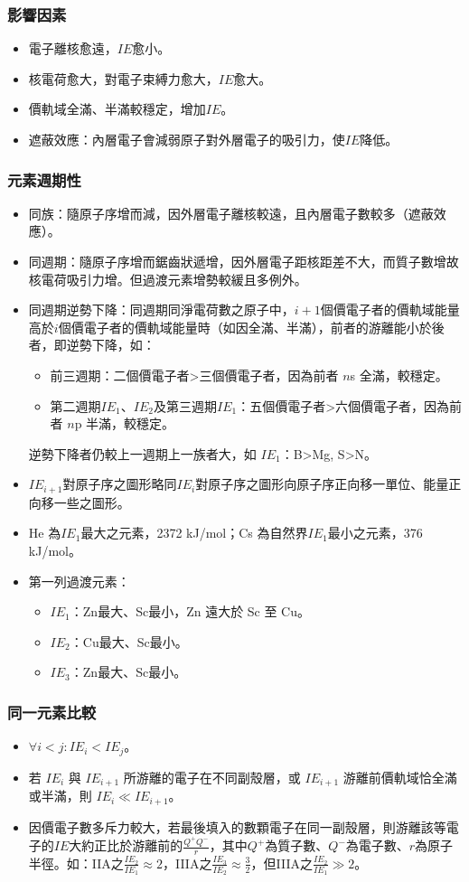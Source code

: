 \documentclass[a4paper,12pt]{article}
\begin{document}
\subsubsection{影響因素}
\begin{itemize}
\item 電子離核愈遠，$IE$愈小。
\item 核電荷愈大，對電子束縛力愈大，$IE$愈大。
\item 價軌域全滿、半滿較穩定，增加$IE$。 
\item 遮蔽效應：內層電子會減弱原子對外層電子的吸引力，使$IE$降低。
\end{itemize}
\subsubsection{元素週期性}
\begin{itemize}
\item 同族：隨原子序增而減，因外層電子離核較遠，且內層電子數較多（遮蔽效應）。
\item 同週期：隨原子序增而鋸齒狀遞增，因外層電子距核距差不大，而質子數增故核電荷吸引力增。但過渡元素增勢較緩且多例外。
\item 同週期逆勢下降：同週期同淨電荷數之原子中，$i+1$個價電子者的價軌域能量高於$i$個價電子者的價軌域能量時（如因全滿、半滿），前者的游離能小於後者，即逆勢下降，如：
\begin{itemize}
\item 前三週期：二個價電子者>三個價電子者，因為前者 $n$s 全滿，較穩定。
\item 第二週期$IE_1$、$IE_2$及第三週期$IE_1$：五個價電子者>六個價電子者，因為前者 $n$p 半滿，較穩定。
\end{itemize}
逆勢下降者仍較上一週期上一族者大，如 $IE_1$：B>Mg, S>N。
\item $IE_{i+1}$對原子序之圖形略同$IE_i$對原子序之圖形向原子序正向移一單位、能量正向移一些之圖形。
\item He 為$IE_1$最大之元素，2372 kJ/mol；Cs 為自然界$IE_1$最小之元素，376 kJ/mol。
\item 第一列過渡元素：
\begin{itemize}
\item $IE_1$：Zn最大、Sc最小，Zn 遠大於 Sc 至 Cu。
\item $IE_2$：Cu最大、Sc最小。
\item $IE_3$：Zn最大、Sc最小。
\end{itemize}
\end{itemize}
\subsubsection{同一元素比較}
\begin{itemize}
\item $\forall i < j\colon IE_i < IE_j$。
\item 若 $IE_i$ 與 $IE_{i+1}$ 所游離的電子在不同副殼層，或 $IE_{i+1}$ 游離前價軌域恰全滿或半滿，則 $IE_i\ll IE_{i+1}$。
\item 因價電子數多斥力較大，若最後填入的數顆電子在同一副殼層，則游離該等電子的$IE$大約正比於游離前的$\frac{Q^+Q^-}{r}$，其中$Q^+$為質子數、$Q^-$為電子數、$r$為原子半徑。如：IIA之$\frac{IE_2}{IE_1}\approx 2$，IIIA之$\frac{IE_3}{IE_2}\approx\frac{3}{2}$，但IIIA之$\frac{IE_2}{IE_1}\gg 2$。
\end{itemize}
\end{document}

